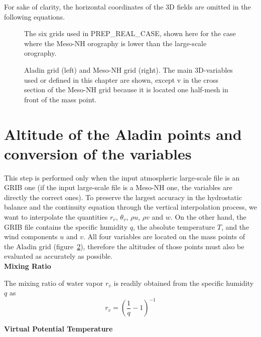 For sake of clarity, the horizontal coordinates of the 3D fields are omitted
in the following equations.

\begin{figure}[htb]
\hspace*{-1.7cm}
\caption{The six grids used in PREP\_REAL\_CASE, shown here for the case
where the Meso-NH orography is lower than the large-scale orography.
\label{fivegrids}}
\end{figure}

\clearpage

\begin{figure}[htb]
\hspace*{-0.5cm}
\caption{Aladin grid (left) and Meso-NH grid (right).
The main 3D-variables used or defined in this chapter
are shown, except v in the cross section of the Meso-NH grid because it
is located one half-mesh in front of the mass point.
\label{grids}}
\end{figure}
\section{Altitude of the Aladin points and conversion of the variables}

This step is performed only when the input atmospheric large-scale file
is an GRIB one (if the input large-scale file is a Meso-NH one,
the variables are directly the correct ones). To preserve the largest
accuracy in the hydrostatic balance and the continuity equation through the
vertical interpolation process, we want to interpolate the quantities
$r_v$, $\theta_v$, $\rho u$, $\rho v$ and $w$. On the other hand, the GRIB
file contains the specific humidity $q$, the absolute temperature $T$,
and the wind components $u$ and $v$. All four variables are located on
the mass points of the Aladin grid (figure~\ref{grids}),
therefore the altitudes of
those points must also be evaluated as accurately as possible. \\

{\bf Mixing Ratio}

The mixing ratio of water vapor $r_v$ is readily obtained from the specific
humidity $q$ as
\begin{equation}
r_v=\left(\frac{1}{q}-1\right)^{-1}
\end{equation}

{\bf Virtual Potential Temperature}

